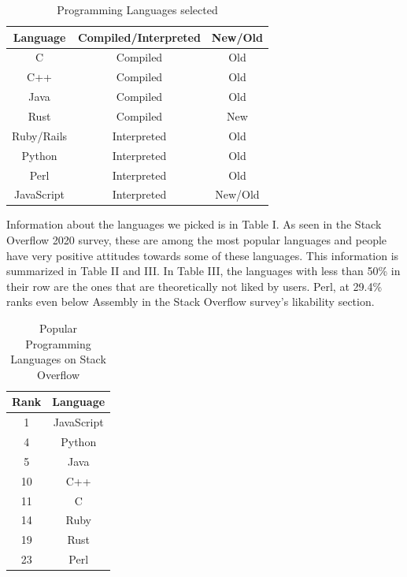 \documentclass[conference]{IEEEtran}
\begin{document}
\begin{table}[htbp]
\caption{Programming Languages selected}
\begin{center}
\begin{tabular}{|c|c|c|}
\hline
\textbf{Language}&\textbf{Compiled/Interpreted}& \textbf{New/Old}\\
\hline
C&Compiled&Old\\
\hline
C++&Compiled&Old\\
\hline
Java&Compiled&Old\\
\hline
Rust&Compiled&New\\
\hline
Ruby/Rails&Interpreted&Old\\
\hline
Python&Interpreted&Old\\
\hline
Perl&Interpreted&Old\\
\hline
JavaScript&Interpreted&New/Old\\
\hline
\end{tabular}
\label{tab1}
\end{center}
\end{table}

Information about the languages we picked is in Table I. As seen in the Stack Overflow 2020 survey\cite{b29}, these are among the most popular languages and people have very positive attitudes towards some of these languages. This information is summarized in Table II and III. In Table III, the languages with less than 50\% in their row are the ones that are theoretically not liked by users. Perl, at 29.4\% ranks even below Assembly in the Stack Overflow survey's likability section.\\

\begin{table}[htbp]
\caption{Popular Programming Languages on Stack Overflow}
\begin{center}
\begin{tabular}{|c|c|}
\hline
\textbf{Rank}&\textbf{Language}\\
\hline
1&JavaScript\\
\hline
4&Python\\
\hline
5&Java\\
\hline
10&C++\\
\hline
11&C\\
\hline
14&Ruby\\
\hline
19&Rust\\
\hline
23&Perl\\
\hline
\end{tabular}
\label{tab1}
\end{center}
\end{table}
\end{document}
